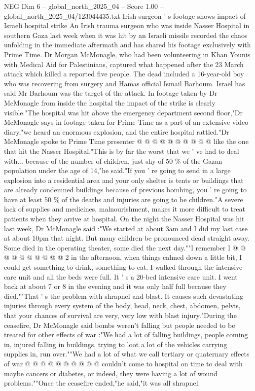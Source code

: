 \begin{textsample}{NEG Dim 6 – global\_north\_2025\_04 – Score 1.00 – global\_north\_2025\_04/123044435.txt}  \label{ex:f6_neg_242}
Irish surgeon ' s footage shows impact of Israeli hospital strike An Irish trauma surgeon who was inside Nasser Hospital in southern Gaza last week when it was hit by an Israeli missile recorded the chaos unfolding in the immediate aftermath and has shared his footage exclusively with Prime Time.
Dr Morgan McMonagle, who had been volunteering in Khan Younis with Medical Aid for Palestinians, captured what happened after the 23 March attack which killed a reported five people.
The dead included a 16-year-old boy who was recovering from surgery and Hamas official Ismail Barhoum.
Israel has said Mr Barhoum was the target of the attack.
In footage taken by Dr McMonagle from inside the hospital the impact of the strike is clearly visible."The hospital was hit above the emergency department second floor,"Dr McMonagle says in footage taken for Prime Time as a part of an extensive video diary,"we heard an enormous explosion, and the entire hospital rattled."Dr McMonagle spoke to Prime Time presenter @ @ @ @ @ @ @ @ @ @ like the one that hit the Nasser Hospital."This is by far the worst that we ' ve had to deal with... because of the number of children, just shy of 50 \% of the Gazan population under the age of 14,"he said."If you ' re going to send in a large explosion into a residential area and your only shelter is tents or buildings that are already condemned buildings because of previous bombing, you ' re going to have at least 50 \% of the deaths and injuries are going to be children."A severe lack of supplies and medicines, malnourishment, makes it more difficult to treat patients when they arrive at hospital.
On the night the Nasser Hospital was hit last week, Dr McMonagle said :"We started at about 3am and I did my last case at about 10pm that night.
But many children be pronounced dead straight away.
Some died in the operating theater, some died the next day.""I remember I @ @ @ @ @ @ @ @ @ @ 2 in the afternoon, when things calmed down a little bit, I could get something to drink, something to eat.
I walked through the intensive care unit and all the beds were full.
It ' s a 20-bed intensive care unit.
I went back at about 7 or 8 in the evening and it was only half full because they died.""That ' s the problem with shrapnel and blast.
It causes such devastating injuries through every system of the body, head, neck, chest, abdomen, pelvis, that your chances of survival are very, very low with blast injury."During the ceasefire, Dr McMonagle said bombs weren't falling but people needed to be treated for other effects of war :"We had a lot of falling buildings, people coming in, injured falling in buildings, trying to loot a lot of the vehicles carrying supplies in, run over.""We had a lot of what we call tertiary or quaternary effects of war @ @ @ @ @ @ @ @ @ @ couldn't come to hospital on time to deal with maybe cancers or diabetes, or indeed, they were having a lot of wound problems.""Once the ceasefire ended,"he said,"it was all shrapnel.

\end{textsample}
